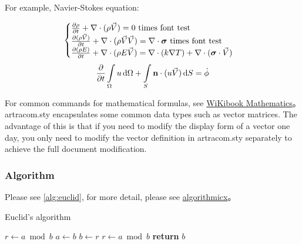 For example, Navier-Stokes equation: 

\begin{equation} \label{eq:ns}
    \begin{cases}
        \frac{\partial \rho}{\partial t} + \nabla\cdot(\rho\Vec{V}) = 0 \ \mathrm{times\ font\ test}\\
        \frac{\partial (\rho\Vec{V})}{\partial t} + \nabla\cdot(\rho\Vec{V}\Vec{V}) = \nabla\cdot\Tensor{\sigma} \ \text{times font test}\\
        \frac{\partial (\rho E)}{\partial t} + \nabla\cdot(\rho E\Vec{V}) = \nabla\cdot(k\nabla T) + \nabla\cdot(\Tensor{\sigma}\cdot\Vec{V})
    \end{cases}
\end{equation}
\begin{equation}
    \frac{\partial }{\partial t}\int\limits_{\Omega} u \, \mathrm{d}\Omega + \int\limits_{S} \boldsymbol{\mathbf{n}}\cdot(u\Vec{V}) \, \mathrm{d}S = \dot{\phi}
\end{equation}

For common commands for mathematical formulas, see \href{https://en.wikibooks.org/wiki/LaTeX/Mathematics}{WiKibook Mathematics}。artracom.sty encapsulates some common data types such as vector matrices. The advantage of this is that if you need to modify the display form of a vector one day, you only need to modify the vector definition in artracom.sty separately to achieve the full document modification.

\subsubsection{Algorithm}

Please see \ref{alg:euclid}, for more detail, please see \href{https://ctan.org/pkg/algorithmicx?lang=en}{algorithmicx}。

\begin{algorithm}[!htbp]
    \small
    \caption{Euclid's algorithm}\label{alg:euclid}
    \begin{algorithmic}[1]
        \State $r\gets a\bmod b$
        \State $a\gets b$
        \State $b\gets r$
        \State $r\gets a\bmod b$
        \EndWhile\label{euclidendwhile}
        \State \textbf{return} $b$
        \EndProcedure
    \end{algorithmic}
\end{algorithm}

